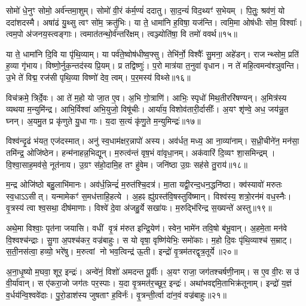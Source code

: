 सोमो॑ धे॒नुꣳ सोमो॒ अर्व॑न्तमा॒शुम्।
सोमो॑ वी॒रं क॑र्म॒ण्यं॑ ददातु।
सा॒द॒न्यं॑ विद॒थ्यꣳ॑ स॒भेयम्।
पि॒तुः॒ श्रव॑णं॒ यो ददा॑शदस्मै।
अषा॑ढं यु॒थ्सु त्वꣳ सो॑म॒ क्रतु॑भिः।
या ते॒ धामा॑नि ह॒विषा॒ यज॑न्ति।
त्वमि॒मा ओष॑धीः सोम॒ विश्वाः᳚।
त्वम॒पो अ॑जनय॒स्त्वङ्गाः।
त्वमात॑तन्थो॒र्व॑न्तरि॑क्षम्।
त्वञ्ज्योति॑षा॒ वि तमो॑ ववर्थ॥१५॥

या ते॒ धामा॑नि दि॒वि या पृ॑थि॒व्याम्।
या पर्व॑ते॒ष्वोष॑धीष्व॒फ्सु।
तेभि॑र्नो॒ विश्वैः᳚ सु॒मना॒ अहे॑डन्।
राजन्थ्सोम॒ प्रति॑ ह॒व्या गृ॑भाय।
विष्णो॒र्नुक॒न्तद॑स्य प्रि॒यम्।
प्र तद्विष्णुः॑।
प॒रो मात्र॑या त॒नुवा॑ वृधान।
न ते॑ महि॒त्वमन्व॑श्ञुवन्ति।
उ॒भे ते॑ विद्म॒ रज॑सी पृथि॒व्या विष्णो॑ देव॒ त्वम्।
प॒र॒मस्य॑ विथ्से॥१६॥

विच॑क्रमे॒ त्रिर्दे॒वः।
आ ते॑ म॒हो यो जा॒त ए॒व।
अ॒भि गो॒त्राणि॑।
आभिः॒ स्पृधो॑ मिथ॒तीररि॑षण्यन्।
अ॒मित्र॑स्य व्यथया म॒न्युमि॑न्द्र।
आभि॒र्विश्वा॑ अभि॒युजो॒ विषू॑चीः।
आर्या॑य॒ विशोव॑तारी॒र्दासीः᳚।
अ॒यꣳ शृ॑ण्वे॒ अध॒ जय॑न्नु॒त घ्नन्।
अ॒यमु॒त प्र कृ॑णुते यु॒धा गाः।
य॒दा स॒त्यं कृ॑णु॒ते म॒न्युमिन्द्रः॑॥१७॥

विश्व॑न्दृ॒ढं भ॑यत॒ एज॑दस्मात्।
अनु॑ स्व॒धाम॑क्षर॒न्नापो॑ अस्य।
अव॑र्धत॒ मध्य॒ आ ना॒व्या॑नाम्।
स॒ध्री॒चीने॑न॒ मन॑सा॒ तमि॑न्द्र॒ ओजि॑ष्ठेन।
हन्म॑नाहन्न॒भिद्यून्।
म॒रुत्व॑न्तं वृष॒भं वा॑वृधा॒नम्।
अक॑वारिं दि॒व्यꣳ शा॒समिन्द्रम्।
वि॒श्वा॒साह॒मव॑से॒ नूत॑नाय।
उ॒ग्रꣳ स॑हो॒दामि॒ह तꣳ हु॑वेम।
जनि॑ष्ठा उ॒ग्रः सह॑से तु॒राय॑॥१८॥

म॒न्द्र ओजि॑ष्ठो बहु॒लाभि॑मानः।
अव॑र्ध॒न्निन्द्रं॑ म॒रुत॑श्चि॒दत्र॑।
मा॒ता यद्वी॒रन्द॒धन॒द्धनि॑ष्ठा।
क्व॑स्यावो॑ मरुतः स्व॒धा\-ऽऽसीत्।
यन्मामेकꣳ॑ स॒मध॑त्ताहि॒हत्ये।
अ॒हꣴ ह्यु॑ग्रस्त॑वि॒षस्तुवि॑ष्मान्।
विश्व॑स्य॒ शत्रो॒रन॑मं वध॒स्नैः।
वृ॒त्रस्य॑ त्वा श्व॒सथा॒ दीष॑माणाः।
विश्वे॑ दे॒वा अ॑जहु॒र्ये सखा॑यः।
म॒रुद्भि॑रिन्द्र स॒ख्यन्ते॑ अस्तु॥१९॥

अथे॒मा विश्वाः॒ पृत॑ना जयासि।
वधीं वृ॒त्रं म॑रुत इन्द्रि॒येण॑।
स्वेन॒ भामे॑न तवि॒षो ब॑भू॒वान्।
अ॒हमे॒ता मन॑वे वि॒श्वश्च॑न्द्राः।
सु॒गा अ॒पश्च॑कर॒ वज्र॑बाहुः।
स यो वृषा॒ वृष्णि॑येभिः॒ समो॑काः।
म॒हो दि॒वः पृ॑थि॒व्याश्च॑ स॒म्राट्।
स॒ती॒नस॑त्वा॒ हव्यो॒ भरे॑षु।
म॒रुत्वां नो भव॒त्विन्द्र॑ ऊ॒ती।
इन्द्रो॑ वृ॒त्रम॑तरद्वृत्र॒तूर्ये॥२०॥

अ॒ना॒धृ॒ष्यो म॒घवा॒ शूर॒ इन्द्रः॑।
अन्वे॑नं॒ विशो॑ अमदन्त पू॒र्वीः।
अ॒यꣳ राजा॒ जग॑तश्चर्\mbox{}षणी॒नाम्।
स ए॒व वी॒रः स उ॑ वी॒र्या॑वान्।
स ए॑करा॒जो जग॑तः पर॒स्पाः।
य॒दा वृ॒त्रमत॑र॒च्छूर॒ इन्द्रः॑।
अथा॑भवद्दमि॒ताभिक्र॑तूनाम्।
इन्द्रो॑ य॒ज्ञं व॒र्धय॑न्वि॒श्ववे॑दाः।
पु॒रो॒डाश॑स्य जुषताꣳ ह॒विर्नः॑।
वृ॒त्रन्ती॒र्त्वा दा॑न॒वं वज्र॑बाहुः॥२१॥


